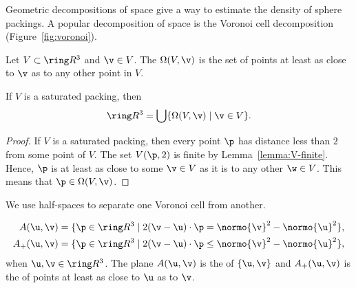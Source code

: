 \begin{cnl}
Geometric decompositions of space give a way to estimate the density
of sphere packings.  A popular decomposition of space
is the Voronoi cell decomposition (Figure~\ref{fig:voronoi}).

\begin{definition}
\label{def:voronoi-cell-omega}
Let $V\subset\vecR{3}$ and $\v\in V$.
The 
$\Omega(V,\v)$
is the set of points at least as close to $\v$ as to
any other point in $V$. 
\end{definition}

\figXOHAZWO %

\begin{lemma}\label{lemma:Voronoi-partition}
If $V$ is a saturated packing, then 
\begin{equation}\label{eqn:vor-rn} 
\vecR{3} = \bigcup \setcomp{\Omega(V,\v)}{ \v \in V}.
\end{equation}
\end{lemma}

\begin{proof}
  If $V$ is a saturated packing, then every point $\p$ has distance 
  less than $2$ from some point of $V$.  The set $\Vee{V}(\p,2)$ is finite
  by Lemma~\ref{lemma:V-finite}.  Hence, $\p$ is at least as close to
  some $\v\in V$ as it is to any other $\w\in V$.  This means that
  $\p\in\Omega(V,\v)$.  
\end{proof}

We use half-spaces to separate one Voronoi cell from another.

\begin{definition}\label{def:half-space}
\begin{align*} 
\AA{\u}{\v} &= \setcomp{\p\in\vecR{3} }{ 2(\v-\u)\cdot \p = \normo{\v}^2 - \normo{\u}^2 },\\
\Aplus(\u,\v) &= \setcomp{\p\in\vecR{3} }{ 2(\v-\u)\cdot \p \le \normo{\v}^2 - \normo{\u}^2 },
\end{align*}
when $\u,\v\in\vecR{3}$.  The plane $\AA{\u}{\v}$ is the  of
$\braced{\u,\v}$ and $\Aplus(\u,\v)$ is the  of points at least as
close to $\u$ as to $\v$.  
\end{definition}
%
%


\end{cnl}
